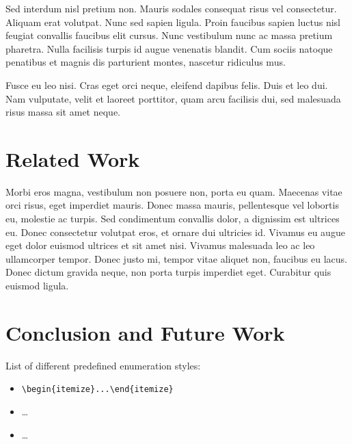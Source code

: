 \documentclass[a4paper,UKenglish,cleveref, autoref, thm-restate]{lipics-v2021}
\begin{document}
\begin{lemma} 
Sed interdum nisl pretium non. Mauris sodales consequat risus vel consectetur. Aliquam erat volutpat. Nunc sed sapien ligula. Proin faucibus sapien luctus nisl feugiat convallis faucibus elit cursus. Nunc vestibulum nunc ac massa pretium pharetra. Nulla facilisis turpis id augue venenatis blandit. Cum sociis natoque penatibus et magnis dis parturient montes, nascetur ridiculus mus.
\end{lemma}

Fusce eu leo nisi. Cras eget orci neque, eleifend dapibus felis. Duis et leo dui. Nam vulputate, velit et laoreet porttitor, quam arcu facilisis dui, sed malesuada risus massa sit amet neque.

\section{Related Work}

Morbi eros magna, vestibulum non posuere non, porta eu quam. Maecenas vitae orci risus, eget imperdiet mauris. Donec massa mauris, pellentesque vel lobortis eu, molestie ac turpis. Sed condimentum convallis dolor, a dignissim est ultrices eu. Donec consectetur volutpat eros, et ornare dui ultricies id. Vivamus eu augue eget dolor euismod ultrices et sit amet nisi. Vivamus malesuada leo ac leo ullamcorper tempor. Donec justo mi, tempor vitae aliquet non, faucibus eu lacus. Donec dictum gravida neque, non porta turpis imperdiet eget. Curabitur quis euismod ligula. 






\appendix

\section{Conclusion and Future Work}\label{sec:itemStyles}

List of different predefined enumeration styles:

\begin{itemize}
\item \verb|\begin{itemize}...\end{itemize}|
\item \dots
\item \dots
\end{itemize}
\end{document}
